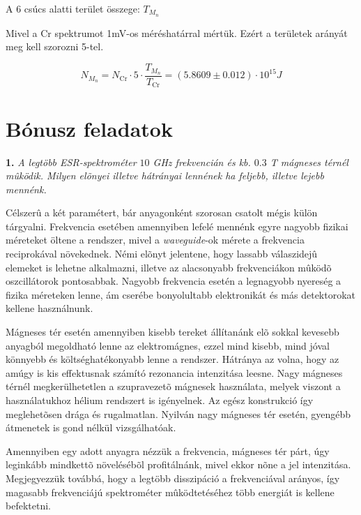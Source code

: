 \documentclass[12pt,a4paper]{article}
\theoremstyle{plain}
\begin{document}
A 6 csúcs alatti terület összege: $T_{M_n}$

Mivel a \textrm{Cr} spektrumot 1mV-os méréshatárral mértük. Ezért a területek arányát meg kell szorozni 5-tel.

\begin{center}
    \begin{equation}
        N_{M_n}= N_{\textrm{Cr}} \cdot 5 \cdot\dfrac{T_{M_n}}{T_{\textrm{Cr}}}=(5.8609 \pm 0.012) \cdot 10^{15} J
    \end{equation}
\end{center}

\section{Bónusz feladatok}

\textbf{1.} \textit{A legtöbb ESR-spektrométer $10$ GHz frekvencián és kb. $0.3$ T mágneses térnél mûködik. Milyen elõnyei illetve hátrányai lennének
ha feljebb, illetve lejebb mennénk.}

\vspace{5mm}

\par Célszerû a két paramétert, bár anyagonként szorosan csatolt mégis külön tárgyalni. Frekvencia esetében amennyiben lefelé mennénk egyre
nagyobb fizikai méreteket öltene a rendszer, mivel a \emph{waveguide}-ok mérete a frekvencia reciprokával növekednek. Némi elõnyt jelentene,
hogy lassabb válaszidejû elemeket is lehetne alkalmazni, illetve az alacsonyabb frekvenciákon mûködõ oszcillátorok pontosabbak. Nagyobb
frekvencia esetén a legnagyobb nyereség a fizika méreteken lenne, ám cserébe bonyolultabb elektronikát és más detektorokat kellene használnunk.

\par Mágneses tér esetén amennyiben kisebb tereket állítanánk elõ sokkal kevesebb anyagból megoldható lenne az elektromágnes, ezzel mind kisebb,
mind jóval könnyebb és költséghatékonyabb lenne a rendszer. Hátránya az volna, hogy az amúgy is kis effektusnak számító rezonancia intenzitása
leesne. Nagy mágneses térnél megkerülhetetlen a szupravezetõ mágnesek használata, melyek viszont a használatukhoz hélium rendszert is igényelnek.
Az egész konstrukció így meglehetõsen drága és rugalmatlan. Nyilván nagy mágneses tér esetén, gyengébb átmenetek is gond nélkül vizsgálhatóak.

\par Amennyiben egy adott anyagra nézzük a frekvencia, mágneses tér párt, úgy leginkább mindkettõ növelésébõl profitálnánk, mivel ekkor
nõne a jel intenzitása. Megjegyezzük továbbá, hogy a legtöbb disszipáció a frekvenciával arányos, így magasabb frekvenciájú spektrométer
mûködtetéséhez több energiát is kellene befektetni.
\end{document}
